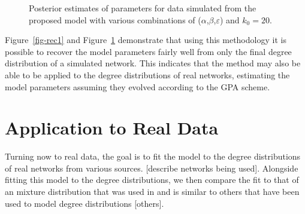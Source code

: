 \documentclass[
  sn-basic,
]{sn-jnl}
\theoremstyle{plain}
\theoremstyle{remark}
\begin{document}
\begin{figure}[H]


\caption{\label{fig-rec2}Posterior estimates of parameters for data
simulated from the proposed model with various combinations of
(\(\alpha\),\(\beta\),\(\varepsilon\)) and \(k_0=20\).}

\end{figure}%

Figure~\ref{fig-rec1} and Figure~\ref{fig-rec2} demonstrate that using
this methodology it is possible to recover the model parameters fairly
well from only the final degree distribution of a simulated network.
This indicates that the method may also be able to be applied to the
degree distributions of real networks, estimating the model parameters
assuming they evolved according to the GPA scheme.

\section{Application to Real Data}\label{sec-real}

Turning now to real data, the goal is to fit the model to the degree
distributions of real networks from various sources. {[}describe
networks being used{]}. Alongside fitting this model to the degree
distributions, we then compare the fit to that of an mixture
distribution that was used in \citet{lef24} and is similar to others
that have been used to model degree distributions {[}others{]}.
\end{document}
